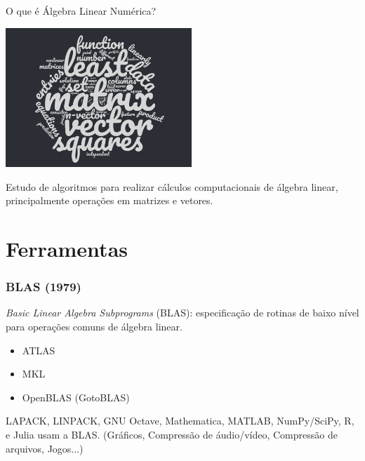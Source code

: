 \documentclass{beamer}
\begin{document}
\begin{darkframes}
  \begin{frame}{O que é Álgebra Linear Numérica?}
    \begin{center}
      \includegraphics[width=7cm]{figures/wordcloud.png}
    \end{center}
    Estudo de algoritmos para realizar cálculos computacionais de álgebra linear, principalmente operações em matrizes e vetores.
  \end{frame}
  
  \section{Ferramentas}
  
  \begin{frame}
    \frametitle{BLAS (1979)}
    \emph{Basic Linear Algebra Subprograms} (BLAS): especificação de rotinas de baixo nível para operações comuns de álgebra linear. %
    \begin{itemize}
    \item ATLAS
    \item MKL
    \item OpenBLAS (GotoBLAS)
    \end{itemize}
    
    LAPACK, LINPACK, GNU Octave, Mathematica, MATLAB, NumPy/SciPy, R, e Julia usam a BLAS. (Gráficos, Compressão de áudio/vídeo, Compressão de arquivos, Jogos...)
  \end{frame}
  

\end{darkframes}
\end{document}
